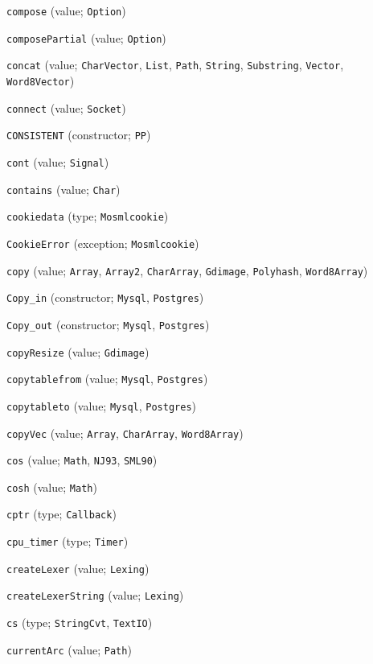 \begin{description}
\item[] \verb"compose" (value; \verb"Option")
\item[] \verb"composePartial" (value; \verb"Option")
\item[] \verb"concat" (value; \verb"CharVector", \verb"List", \verb"Path", \verb"String", \verb"Substring", \verb"Vector", \verb"Word8Vector")
\item[] \verb"connect" (value; \verb"Socket")
\item[] \verb"CONSISTENT" (constructor; \verb"PP")
\item[] \verb"cont" (value; \verb"Signal")
\item[] \verb"contains" (value; \verb"Char")
\item[] \verb"cookiedata" (type; \verb"Mosmlcookie")
\item[] \verb"CookieError" (exception; \verb"Mosmlcookie")
\item[] \verb"copy" (value; \verb"Array", \verb"Array2", \verb"CharArray", \verb"Gdimage", \verb"Polyhash", \verb"Word8Array")
\item[] \verb"Copy_in" (constructor; \verb"Mysql", \verb"Postgres")
\item[] \verb"Copy_out" (constructor; \verb"Mysql", \verb"Postgres")
\item[] \verb"copyResize" (value; \verb"Gdimage")
\item[] \verb"copytablefrom" (value; \verb"Mysql", \verb"Postgres")
\item[] \verb"copytableto" (value; \verb"Mysql", \verb"Postgres")
\item[] \verb"copyVec" (value; \verb"Array", \verb"CharArray", \verb"Word8Array")
\item[] \verb"cos" (value; \verb"Math", \verb"NJ93", \verb"SML90")
\item[] \verb"cosh" (value; \verb"Math")
\item[] \verb"cptr" (type; \verb"Callback")
\item[] \verb"cpu_timer" (type; \verb"Timer")
\item[] \verb"createLexer" (value; \verb"Lexing")
\item[] \verb"createLexerString" (value; \verb"Lexing")
\item[] \verb"cs" (type; \verb"StringCvt", \verb"TextIO")
\item[] \verb"currentArc" (value; \verb"Path")
\\[2ex]


\end{description}
